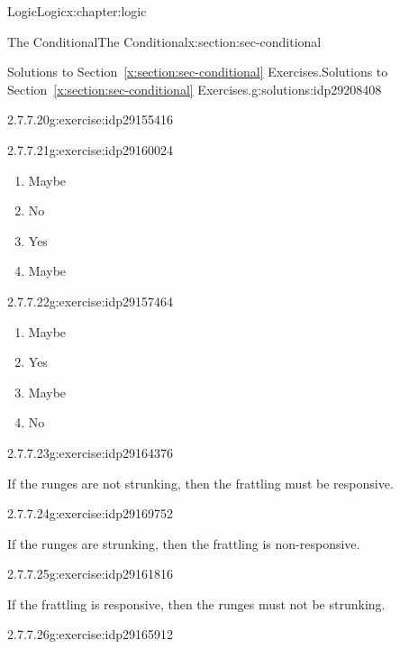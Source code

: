 \documentclass[twoside,10pt,]{book}
\newcommand{\xreffont}{\relax}
\numberwithin{equation}{section}
\begin{document}
\begin{chapterptx}{Logic}{}{Logic}{}{}{x:chapter:logic}
\begin{sectionptx}{The Conditional}{}{The Conditional}{}{}{x:section:sec-conditional}
\begin{solutions-subsection}{Solutions to Section~{\xreffont\ref*{x:section:sec-conditional}} Exercises.}{}{Solutions to Section~{\xreffont\ref*{x:section:sec-conditional}} Exercises.}{}{}{g:solutions:idp29208408}
\begin{divisionsolution}{2.7.7.20}{}{g:exercise:idp29155416}
\end{divisionsolution}%
\begin{exercisegroup}
\begin{divisionsolutioneg}{2.7.7.21}{}{g:exercise:idp29160024}%
\par\smallskip%
\noindent\hypertarget{g:solution:idp29161304-main}{}%
\begin{enumerate}[label=(\alph*)]
\item{}Maybe%
\item{}No%
\item{}Yes%
\item{}Maybe%
\end{enumerate}
\end{divisionsolutioneg}%
\begin{divisionsolutioneg}{2.7.7.22}{}{g:exercise:idp29157464}%
\par\smallskip%
\noindent\hypertarget{g:solution:idp29167832-main}{}%
\begin{enumerate}[label=(\alph*)]
\item{}Maybe%
\item{}Yes%
\item{}Maybe%
\item{}No%
\end{enumerate}
\end{divisionsolutioneg}%
\end{exercisegroup}
\par\medskip\noindent
\begin{exercisegroup}
\begin{divisionsolutioneg}{2.7.7.23}{}{g:exercise:idp29164376}%
\par\smallskip%
\noindent\hypertarget{g:solution:idp29169624-main}{}If the runges are not strunking, then the frattling must be responsive.\end{divisionsolutioneg}%
\begin{divisionsolutioneg}{2.7.7.24}{}{g:exercise:idp29169752}%
\par\smallskip%
\noindent\hypertarget{g:solution:idp29164760-main}{}If the runges are strunking, then the frattling is non-responsive.\end{divisionsolutioneg}%
\begin{divisionsolutioneg}{2.7.7.25}{}{g:exercise:idp29161816}%
\par\smallskip%
\noindent\hypertarget{g:solution:idp29163224-main}{}If the frattling is responsive, then the runges must not be strunking.\end{divisionsolutioneg}%
\begin{divisionsolutioneg}{2.7.7.26}{}{g:exercise:idp29165912}%

\end{divisionsolutioneg}
\end{exercisegroup}
\end{solutions-subsection}
\end{sectionptx}
\end{chapterptx}
\end{document}
